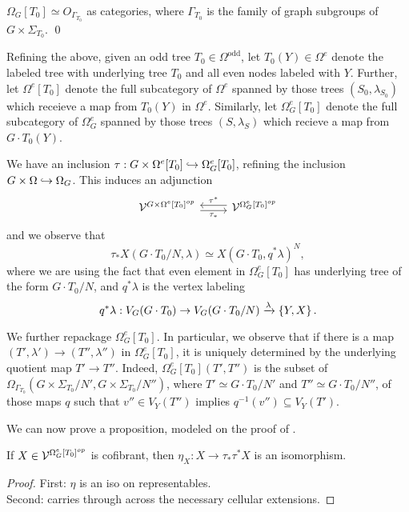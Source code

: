 \documentclass[a4paper,10pt]{article}%
\begin{document}
\begin{lemma}
  $\Omega_G[T_0] \simeq O_{\Gamma_{T_0}}$ as categories, where $\Gamma_{T_0}$ is the family of graph subgroups of $G\times \Sigma_{T_0}$. \qed
\end{lemma}
  
\begin{definition}
Refining the above, given an odd tree $T_0\in \Omega^{\mbox{odd}}$, let $T_0(Y)\in\Omega^e$ denote the labeled tree with underlying tree $T_0$ and all even nodes labeled with $Y$. 
Further, let $\Omega^e[T_0]$ denote the full subcategory of $\Omega^e$ spanned by those trees $(S_0,\lambda_{S_0})$ which receieve a map from $T_0(Y)$ in $\Omega^e$. 
Similarly, let $\Omega_G^e[T_0]$ denote the full subcategory of $\Omega_G^e$ spanned by those trees $(S,\lambda_S)$ which recieve a map from $G\cdot T_0(Y)$.
\end{definition}

We have an inclusion $\tau: G \times \Omega^e[T_0] \hookrightarrow \Omega_G^e[T_0]$, refining the inclusion $G \times \Omega \hookrightarrow \Omega_G$. This induces an adjunction
\[
\begin{tikzcd}
\V^{G\times \Omega^e[T_0]^{op}} \arrow[r, shift right, "\tau_*"'] & \V^{\Omega_G^e[T_0]^{op}} \arrow[l, shift right, "\tau^*"']
\end{tikzcd}
\]
and we observe that
\[
\tau_*X(G\cdot T_0/N, \lambda) \simeq X(G\cdot T_0, q^*\lambda)^N,
\]
where we are using the fact that even element in $\Omega_G^e[T_0]$ has underlying tree of the form $G\cdot T_0/N$, and $q^*\lambda$ is the vertex labeling 
\[
q^*\lambda: V_G(G \cdot T_0) \to V_G(G \cdot T_0/N) \xrightarrow{\lambda} \left\{Y,X\right\}.
\]

We further repackage $\Omega_G^e[T_0]$. In particular, we observe that if there is a map $(T',\lambda') \to (T'', \lambda'')$ in $\Omega_G^e[T_0]$, it is uniquely determined by the underlying quotient map $T' \to T''$. Indeed, $\Omega_G^e[T_0](T',T'')$ is the subset of $\Omega_{\Gamma_{T_0}}(G\times \Sigma_{T_0}/N', G\times\Sigma_{T_0}/N'')$, where $T' \simeq G\cdot T_0/N'$ and $T'' \simeq G\cdot T_0/N''$, of those maps $q$ such that $v''\in V_Y(T'')$ implies $q^{-1}(v'')\subseteq V_Y(T')$. 

We can now prove a proposition, modeled on the proof of \cite[Theorem 2.10]{Stephan16}.
\begin{proposition}
 If $X\in \mathcal V^{\Omega_G^e[T_0]^{op}}$ is cofibrant, then $\eta_X: X \to \tau_*\tau^*X$ is an isomorphism.
\end{proposition}
\begin{proof}
First: $\eta$ is an iso on representables.\\
Second: carries through across the necessary cellular extensions.
\end{proof}
\end{document}
